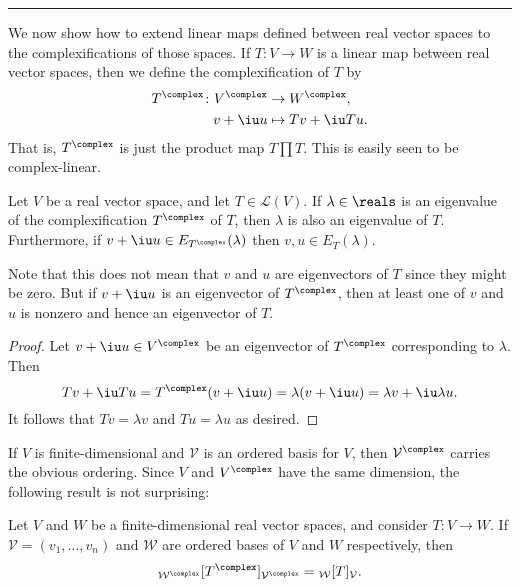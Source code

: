 \documentclass[article, a4paper, 11pt, oneside]{memoir}
\numberwithin{equation}{chapter}
\newcommand{\calL}{\mathcal{L}}
\newcommand{\calV}{\mathcal{V}}
\newcommand{\calW}{\mathcal{W}}
\newcommand\fleuronbreak{\fancybreak{\textcolor{linkcolor}{\adfhangingflatleafleft}}}
\begin{document}
\fleuronbreak

We now show how to extend linear maps defined between real vector spaces to the complexifications of those spaces. If $T \colon V \to W$ is a linear map between real vector spaces, then we define the complexification of $T$ by
%
\begin{align*}
    T^\complex \colon V^\complex &\to W^\complex, \\
    v + \iu u &\mapsto Tv + \iu Tu.
\end{align*}
%
That is, $T^\complex$ is just the product map $T \prod T$. This is easily seen to be complex-linear.


\begin{proposition}
    \label{prop:complexification-eigenvalue}
    Let $V$ be a real vector space, and let $T \in \calL(V)$. If $\lambda \in \reals$ is an eigenvalue of the complexification $T^\complex$ of $T$, then $\lambda$ is also an eigenvalue of $T$. Furthermore, if $v + \iu u \in E_{T^\complex}(\lambda)$ then $v,u \in E_T(\lambda)$.
\end{proposition}
%
Note that this does not mean that $v$ and $u$ are eigenvectors of $T$ since they might be zero. But if $v + \iu u$ is an eigenvector of $T^\complex$, then at least one of $v$ and $u$ is nonzero and hence an eigenvector of $T$.

\begin{proof}
    Let $v + \iu u \in V^\complex$ be an eigenvector of $T^\complex$ corresponding to $\lambda$. Then
    \begin{equation*}
        Tv + \iu Tu
            = T^\complex (v + \iu u)
            = \lambda(v + \iu u)
            = \lambda v + \iu \lambda u.
    \end{equation*}
    It follows that $Tv = \lambda v$ and $Tu = \lambda u$ as desired.
\end{proof}


If $V$ is finite-dimensional and $\calV$ is an ordered basis for $V$, then $\calV^\complex$ carries the obvious ordering. Since $V$ and $V^\complex$ have the same dimension, the following result is not surprising:

\begin{proposition}
    Let $V$ and $W$ be a finite-dimensional real vector spaces, and consider $T \colon V \to W$. If $\calV = (v_1, \ldots, v_n)$ and $\calW$ are ordered bases of $V$ and $W$ respectively, then
    \begin{equation*}
        \mr{\calW^\complex}{T^\complex}{\calV^\complex}
            = \mr{\calW}{T}{\calV}.
    \end{equation*}
\end{proposition}
\end{document}
